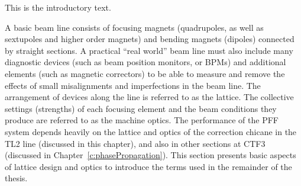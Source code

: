 
This is the introductory text.


A basic beam line consists of focusing magnets (quadrupoles, as well as sextupoles and higher order magnets) and bending magnets (dipoles) connected by straight sections. A practical ``real world'' beam line must also include many diagnostic devices (such as beam position monitors, or BPMs) and additional elements (such as magnetic correctors) to be able to measure and remove the effects of small misalignments and imperfections in the beam line. The arrangement of devices along the line is referred to as the lattice. The collective settings (strengths) of each focusing element and the beam conditions they produce are referred to as the machine optics. The performance of the PFF system depends heavily on the lattice and optics of the correction chicane in the TL2 line (discussed in this chapter), and also in other sections at CTF3 (discussed in Chapter~\ref{c:phasePropagation}). This section presents basic aspects of lattice design and optics to introduce the terms used in the remainder of the thesis.

